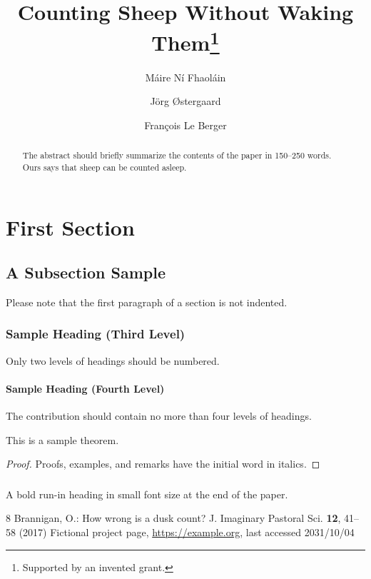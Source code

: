 \documentclass[runningheads]{llncs}
\begin{document}
\title{Counting Sheep Without Waking Them\thanks{Supported by an invented grant.}}
\author{M\'aire N\'i Fhaol\'ain \and
J\"org \O{}stergaard \and
Fran\c{c}ois Le Berger}
\maketitle
\begin{abstract}
The abstract should briefly summarize the contents of the paper in 150--250 words. Ours says that sheep can be counted asleep.
\end{abstract}
\section{First Section}
\subsection{A Subsection Sample}
Please note that the first paragraph of a section is not indented.
\subsubsection{Sample Heading (Third Level)} Only two levels of headings should be numbered.
\paragraph{Sample Heading (Fourth Level)}
The contribution should contain no more than four levels of headings.
\begin{theorem}
This is a sample theorem.
\end{theorem}
\begin{proof}
Proofs, examples, and remarks have the initial word in italics.
\end{proof}
\begin{credits}
\subsubsection{\ackname} A bold run-in heading in small font size at the end of the paper.
\end{credits}
\begin{thebibliography}{8}
Brannigan, O.: How wrong is a dusk count? J. Imaginary Pastoral Sci. \textbf{12}, 41--58 (2017)
Fictional project page, \url{https://example.org}, last accessed 2031/10/04
\end{thebibliography}
\end{document}

